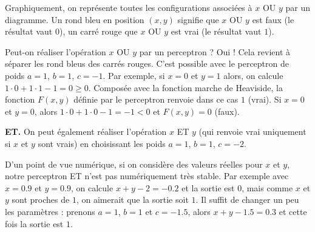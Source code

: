 \documentclass[11pt,class=report,crop=false]{standalone}
\begin{document}
Graphiquement, on représente toutes les configurations associées à \og{}$x$ OU $y$\fg{} par un diagramme. Un rond bleu en position $(x,y)$ signifie que \og{}$x$ OU $y$\fg{} est faux (le résultat vaut $0$), un carré rouge que \og{}$x$ OU $y$\fg{} est vrai (le résultat vaut $1$).



Peut-on réaliser l'opération \og{}$x$ OU $y$\fg{} par un perceptron ? 
Oui ! Cela revient à séparer les rond bleus des carrés rouges.
C'est possible avec le perceptron de poids $a=1$, $b=1$, $c=-1$.
Par exemple, si $x=0$ et $y=1$ alors, on calcule $1\cdot0+1\cdot1-1 = 0 \ge0$. Composée avec la fonction marche de Heaviside, la fonction $F(x,y)$
définie par le perceptron renvoie dans ce cas $1$ (\og{}vrai\fg{}).
Si $x=0$ et $y=0$, alors $1\cdot0+1\cdot0-1 = -1 <0$ et $F(x,y)=0$ (\og{}faux\fg{}).

\begin{center}
\begin{minipage}{0.35\textwidth}
\end{minipage}
\begin{minipage}{0.45\textwidth}
\end{minipage}
\end{center}


\bigskip
\textbf{ET.}
On peut également réaliser l'opération \og{}$x$ ET $y$\fg{} (qui renvoie \og{}vrai\fg{} uniquement si $x$ et $y$ sont vrais) en choisissant les poids $a=1$, $b=1$, $c=-2$.

\begin{center}
\begin{minipage}{0.35\textwidth}
\end{minipage}
\begin{minipage}{0.45\textwidth}
\end{minipage}
\end{center}

\begin{remarque*}
D'un point de vue numérique, si on considère des valeurs réelles pour $x$ et $y$, notre perceptron \og{}ET\fg{} n'est pas numériquement très stable.
Par exemple avec $x=0.9$ et $y=0.9$, on calcule $x+y-2=-0.2$ et la sortie est $0$, mais comme $x$ et $y$ sont proches de $1$, on aimerait que la sortie soit $1$.
Il suffit de changer un peu les paramètres : prenons $a=1$, $b=1$ et $c=-1.5$, alors $x+y-1.5=0.3$ et cette fois la sortie est $1$.
\end{remarque*}
\end{document}
